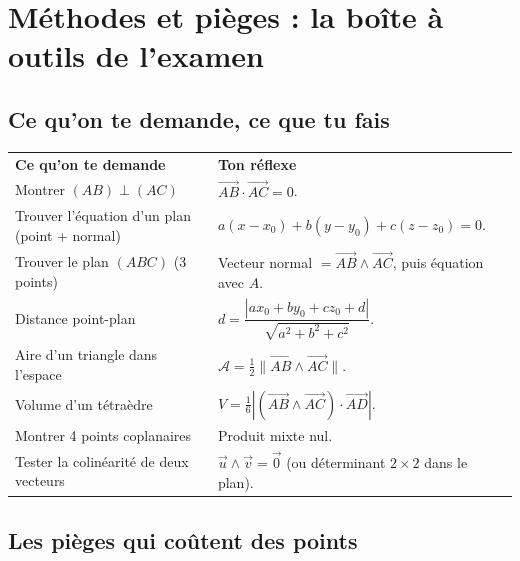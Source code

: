 \documentclass[11pt,a4paper]{article}
\begin{document}
\section{Méthodes et pièges : la boîte à outils de l'examen}

\subsection{Ce qu'on te demande, ce que tu fais}

\begin{center}
\renewcommand{\arraystretch}{1.45}
\sffamily\small
\begin{tabular}{>{\raggedright\arraybackslash}p{7.2cm} >{\raggedright\arraybackslash}p{8cm}}
\rowcolor{qtealdark} \color{white}\bfseries Ce qu'on te demande & \color{white}\bfseries Ton réflexe \\
\rowcolor{tealpale} Montrer $(AB)\perp(AC)$ & $\overrightarrow{AB}\cdot\overrightarrow{AC}=0$. \\
Trouver l'équation d'un plan (point + normal) & $a(x-x_0)+b(y-y_0)+c(z-z_0)=0$. \\
\rowcolor{tealpale} Trouver le plan $(ABC)$ (3 points) & Vecteur normal $=\overrightarrow{AB}\wedge\overrightarrow{AC}$, puis équation avec $A$. \\
Distance point-plan & $d=\dfrac{|ax_0+by_0+cz_0+d|}{\sqrt{a^2+b^2+c^2}}$. \\
\rowcolor{tealpale} Aire d'un triangle dans l'espace & $\mathcal{A}=\frac12\|\overrightarrow{AB}\wedge\overrightarrow{AC}\|$. \\
Volume d'un tétraèdre & $V=\frac16|(\overrightarrow{AB}\wedge\overrightarrow{AC})\cdot\overrightarrow{AD}|$. \\
\rowcolor{tealpale} Montrer 4 points coplanaires & Produit mixte nul. \\
Tester la colinéarité de deux vecteurs & $\vec u\wedge\vec v=\vec0$ (ou déterminant $2\times2$ dans le plan). \\
\end{tabular}
\end{center}

\subsection{Les pièges qui coûtent des points}
\end{document}
